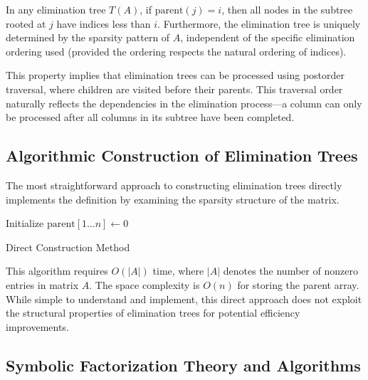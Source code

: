 \begin{theorem}
In any elimination tree $T(A)$, if $\text{parent}(j) = i$, then all nodes in the subtree rooted at $j$ have indices less than $i$. Furthermore, the elimination tree is uniquely determined by the sparsity pattern of $A$, independent of the specific elimination ordering used (provided the ordering respects the natural ordering of indices).
\end{theorem}

This property implies that elimination trees can be processed using postorder traversal, where children are visited before their parents. This traversal order naturally reflects the dependencies in the elimination process—a column can only be processed after all columns in its subtree have been completed.

\subsection{Algorithmic Construction of Elimination Trees}

The most straightforward approach to constructing elimination trees directly implements the definition by examining the sparsity structure of the matrix.

\begin{algorithm}
\BlankLine
Initialize $\text{parent}[1 \ldots n] \leftarrow 0$ 
\caption{Direct Construction Method}
\label{alg:direct_elimination_tree}
\end{algorithm}

This algorithm requires $O(|A|)$ time, where $|A|$ denotes the number of nonzero entries in matrix $A$. The space complexity is $O(n)$ for storing the parent array. While simple to understand and implement, this direct approach does not exploit the structural properties of elimination trees for potential efficiency improvements.

\subsection{Symbolic Factorization Theory and Algorithms}

